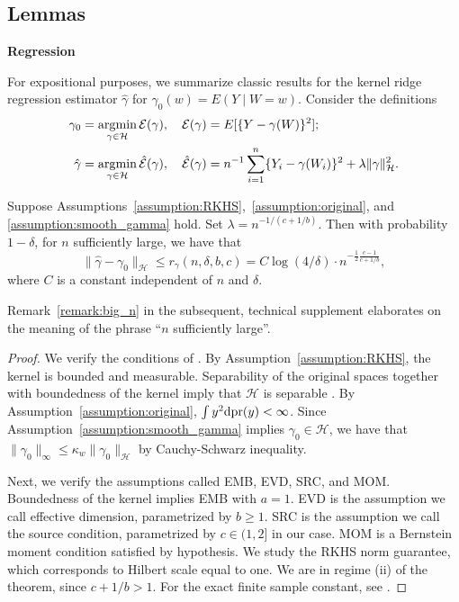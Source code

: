 \subsection{Lemmas}

\textbf{Regression}

For expositional purposes, we summarize classic results for the kernel ridge regression estimator $\hat{\gamma}$ for $\gamma_0(w)=E(Y \mid W=w)$. Consider the definitions
\begin{align*}
    \gamma_0&=\operatorname*{\arg\!\min}_{\gamma\in\mathcal{H}}\mathcal{E}(\gamma),\quad \mathcal{E}(\gamma)=E[\{Y-\gamma(W)\}^2]; \\
    \hat{\gamma}&=\operatorname*{\arg\!\min}_{\gamma\in\mathcal{H}}\hat{\mathcal{E}}(\gamma),\quad \hat{\mathcal{E}}(\gamma)=n^{-1}\sum_{i=1}^n\{Y_i-\gamma(W_i)\}^2+\lambda\|\gamma\|^2_{\mathcal{H}}.
\end{align*}

\begin{proposition}\label{theorem:regression}
Suppose Assumptions~\ref{assumption:RKHS},~\ref{assumption:original}, and \ref{assumption:smooth_gamma} hold. Set $\lambda=n^{-1/(c+1/b)}$. Then with probability $1-\delta$, for $n$ sufficiently large, we have that
$$
\|\hat{\gamma}-\gamma_0\|_{\mathcal{H}}\leq r_{\gamma}(n,\delta,b,c)=C\log(4/\delta) \cdot n^{-\frac{1}{2}\frac{c-1}{c+1/b}},
$$
where $C$ is a constant independent of $n$ and $\delta$.
\end{proposition}

Remark~\ref{remark:big_n} in the subsequent, technical supplement elaborates on the meaning of the phrase ``$n$ sufficiently large''.

\begin{proof}
We verify the conditions of \cite[Theorem 1.ii]{fischer2017sobolev}. By Assumption~\ref{assumption:RKHS}, the kernel is bounded and measurable. Separability of the original spaces together with boundedness of the kernel imply that $\mathcal{H}$ is separable \cite[Lemma 4.33]{steinwart2008support}. By Assumption~\ref{assumption:original}, $\int y^2\mathrm{d}\text{\normalfont pr}(y)<\infty$. Since Assumption~\ref{assumption:smooth_gamma} implies $\gamma_0\in\mathcal{H}$, we have that $\|\gamma_0\|_{\infty}\leq \kappa_w \|\gamma_0\|_{\mathcal{H}}$ by Cauchy-Schwarz inequality. 

Next, we verify the assumptions called EMB, EVD, SRC, and MOM. Boundedness of the kernel implies EMB with $a=1$. EVD is the assumption we call effective dimension, parametrized by $b\geq 1$. SRC is the assumption we call the source condition, parametrized by $c\in(1,2]$ in our case. MOM is a Bernstein moment condition satisfied by hypothesis. We study the RKHS norm guarantee, which corresponds to Hilbert scale equal to one. We are in regime (ii) of the theorem, since $c+1/b>1$. For the exact finite sample constant, see \cite[Theorem 16]{fischer2017sobolev}.
\end{proof}


